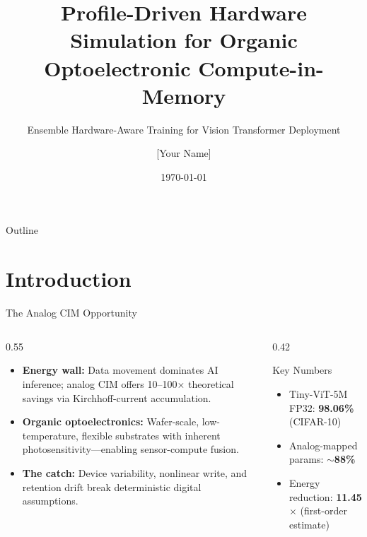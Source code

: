 \documentclass[aspectratio=169,11pt]{beamer}
\title[Ensemble HAT for Organic CIM]{Profile-Driven Hardware Simulation for Organic Optoelectronic Compute-in-Memory}
\subtitle{Ensemble Hardware-Aware Training for Vision Transformer Deployment}
\author{[Your Name]}
\institute{{[Department]} \\ {[University]}}
\date{\today}
\newcommand{\dataset}[1]{\textsc{#1}}
\begin{document}
\begin{frame}
  \titlepage
\end{frame}


\begin{frame}{Outline}
  \tableofcontents
\end{frame}


\section{Introduction}

\begin{frame}{The Analog CIM Opportunity}
  \begin{columns}
    \begin{column}{0.55\textwidth}
      \begin{itemize}
        \item \textbf{Energy wall:} Data movement dominates AI inference; analog CIM offers 10--100$\times$ theoretical savings via Kirchhoff-current accumulation.
        \item \textbf{Organic optoelectronics:} Wafer-scale, low-temperature, flexible substrates with inherent photosensitivity---enabling sensor-compute fusion.
        \item \textbf{The catch:} Device variability, nonlinear write, and retention drift break deterministic digital assumptions.
      \end{itemize}
    \end{column}
    \begin{column}{0.42\textwidth}
      \begin{block}{Key Numbers}
        \begin{itemize}
          \item Tiny-ViT-5M FP32: \textbf{98.06\%} (\dataset{CIFAR-10})
          \item Analog-mapped params: \textbf{$\sim$88\%}
          \item Energy reduction: \textbf{11.45$\times$} (first-order estimate)
        \end{itemize}
      \end{block}
    \end{column}
  \end{columns}
\end{frame}
\end{document}

